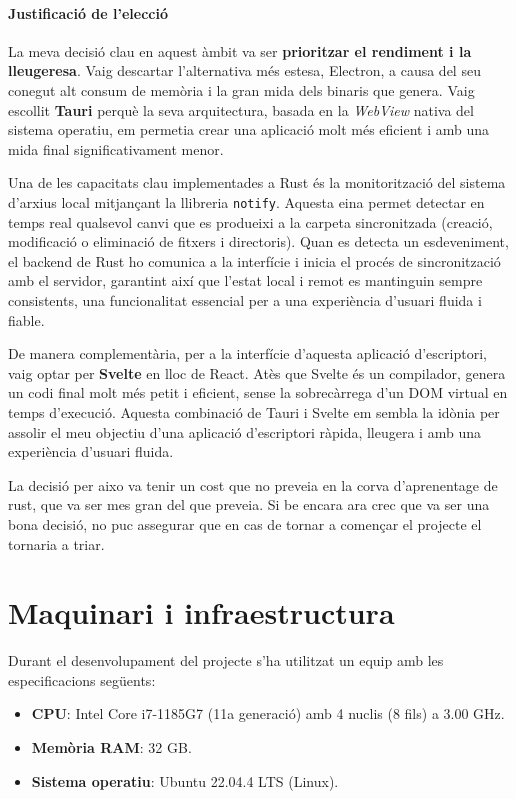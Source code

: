 \paragraph{Justificació de l'elecció}
La meva decisió clau en aquest àmbit va ser \textbf{prioritzar el rendiment i la lleugeresa}. Vaig descartar l'alternativa més estesa, Electron, a causa del seu conegut alt consum de memòria i la gran mida dels binaris que genera. Vaig escollit \textbf{Tauri} perquè la seva arquitectura, basada en la \textit{WebView} nativa del sistema operatiu, em permetia crear una aplicació molt més eficient i amb una mida final significativament menor.

Una de les capacitats clau implementades a Rust és la monitorització del sistema d'arxius local mitjançant la llibreria \texttt{notify}. Aquesta eina permet detectar en temps real qualsevol canvi que es produeixi a la carpeta sincronitzada (creació, modificació o eliminació de fitxers i directoris). Quan es detecta un esdeveniment, el backend de Rust ho comunica a la interfície i inicia el procés de sincronització amb el servidor, garantint així que l'estat local i remot es mantinguin sempre consistents, una funcionalitat essencial per a una experiència d'usuari fluida i fiable.

De manera complementària, per a la interfície d'aquesta aplicació d'escriptori, vaig optar per \textbf{Svelte} en lloc de React. Atès que Svelte és un compilador, genera un codi final molt més petit i eficient, sense la sobrecàrrega d'un DOM virtual en temps d'execució. Aquesta combinació de Tauri i Svelte em sembla la idònia per assolir el meu objectiu d'una aplicació d'escriptori ràpida, lleugera i amb una experiència d'usuari fluida.

La decisió per aixo va tenir un cost que no preveia en la corva d'aprenentage de rust, que va ser mes gran del que preveia. Si be encara ara crec que va ser una bona decisió, no puc assegurar que en cas de tornar a començar el projecte el tornaria a triar.

\section{Maquinari i infraestructura}
Durant el desenvolupament del projecte s'ha utilitzat un equip amb les especificacions següents:

\begin{itemize}
\item \textbf{CPU}: Intel Core i7-1185G7 (11a generació) amb 4 nuclis (8 fils) a 3.00 GHz.
\item \textbf{Memòria RAM}: 32 GB.
\item \textbf{Sistema operatiu}: Ubuntu 22.04.4 LTS (Linux).
\end{itemize}

